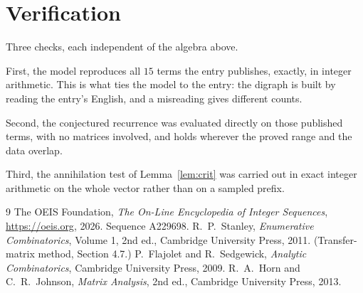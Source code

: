 \documentclass[11pt,a4paper]{article}
\theoremstyle{plain}
\theoremstyle{definition}
\begin{document}
\section{Verification}

Three checks, each independent of the algebra above.

First, the model reproduces all $15$ terms the entry publishes, exactly, in integer
arithmetic. This is what ties the model to the entry: the digraph is built by reading the
entry's English, and a misreading gives different counts.

Second, the conjectured recurrence was evaluated directly on those published terms, with no
matrices involved, and holds wherever the proved range and the data overlap.

Third, the annihilation test of Lemma~\ref{lem:crit} was carried out in exact integer
arithmetic on the whole vector rather than on a sampled prefix.

\begin{thebibliography}{9}
 The OEIS Foundation, \emph{The On-Line Encyclopedia of Integer
Sequences}, \url{https://oeis.org}, 2026. Sequence A229698.
 R.~P.~Stanley, \emph{Enumerative Combinatorics}, Volume 1, 2nd ed.,
Cambridge University Press, 2011. (Transfer-matrix method, Section 4.7.)
 P.~Flajolet and R.~Sedgewick, \emph{Analytic Combinatorics}, Cambridge
University Press, 2009.
 R.~A.~Horn and C.~R.~Johnson, \emph{Matrix Analysis}, 2nd ed., Cambridge
University Press, 2013.
\end{thebibliography}
\end{document}
